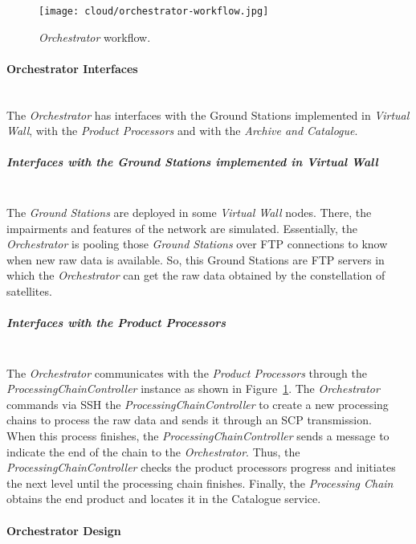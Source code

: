 \begin{figure}[!h]
\begin{center}
\texttt{[image: cloud/orchestrator-workflow.jpg]}
\caption{\emph{Orchestrator} workflow.}
\label{fig:orchestrator-workflow}
\end{center}
\end{figure}

\paragraph{Orchestrator Interfaces}~\\

The \emph{Orchestrator} has interfaces with the Ground Stations implemented in
\emph{Virtual Wall}, with the \emph{Product Processors} and with the
\emph{Archive and Catalogue}.
\subparagraph{Interfaces with the Ground Stations implemented in Virtual
  Wall}~\\

The \emph{Ground Stations} are deployed in some \emph{Virtual Wall} nodes. There, the impairments and features of the network are simulated. Essentially,
the \emph{Orchestrator} is pooling those \emph{Ground Stations} over \ac{FTP}
connections to know when new raw data is available. So, this Ground Stations are
\ac{FTP} servers in which the \emph{Orchestrator} can get the raw data obtained
by the constellation of satellites.

\subparagraph{Interfaces with the Product Processors}~\\

The \emph{Orchestrator} communicates with the \emph{Product Processors} through
the \emph{ProcessingChainController} instance as shown in
Figure~\ref{fig:orchestrator-workflow}. The \emph{Orchestrator} commands via
\ac{SSH} the \emph{ProcessingChainController} to create a new processing chains
to process the raw data and sends it through an \ac{SCP} transmission. \\
When this
process finishes, the \emph{ProcessingChainController} sends  a message to
indicate the end of the chain to the \emph{Orchestrator}. Thus, the
\emph{ProcessingChainController} checks the product processors progress and
initiates the next level until the processing chain finishes. Finally, the
\emph{Processing Chain} obtains the end product and locates it in the Catalogue service. 

\paragraph{Orchestrator Design}~\\

